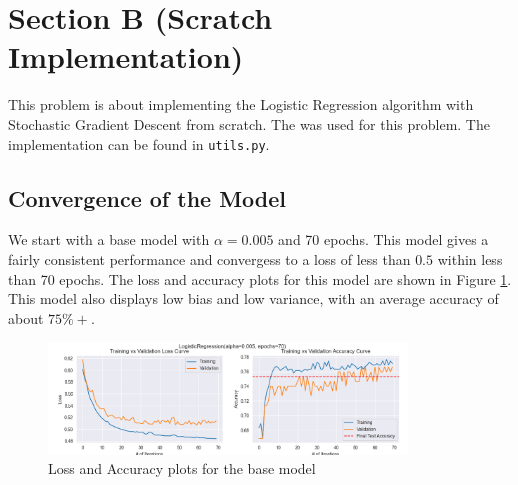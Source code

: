 \documentclass[12pt]{article}
\begin{document}
    \section{Section B (Scratch Implementation)}

    This problem is about implementing the Logistic Regression algorithm with Stochastic Gradient Descent from scratch.
    The \href{https://drive.google.com/file/d/1p7ivBMLoT-Zxp8_9Pt8n8oWUjqLdBxPN/view?usp=drive_link}{
        \textbf{\color{blue}{Diabetes Healthcare Dataset}}
    } was used for this problem. The implementation can be found in \texttt{utils.py}.

    \subsection*{Convergence of the Model}
    We start with a base model with $\alpha = 0.005$ and 70 epochs. This model gives a fairly consistent performance
    and convergess to a loss of less than $0.5$ within less than 70 epochs. The loss and accuracy plots for this model are shown in
    Figure \ref{fig:base_model}.
    \vspace*{5pt} \\
    This model also displays low bias and low variance, with an average accuracy of about $75\%+$.
    \begin{figure}[h]
        \centering
        \includegraphics[width=0.85\textwidth]{./../Assets/base_model.png}
        \caption{Loss and Accuracy plots for the base model}
        \label{fig:base_model}
    \end{figure}
\end{document}
